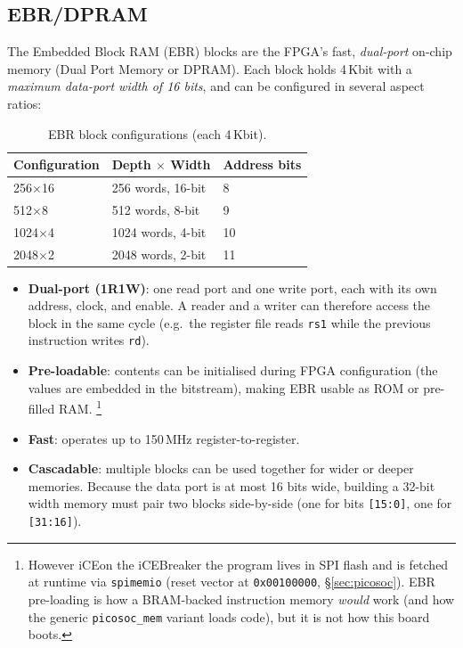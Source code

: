 \documentclass[9pt, a4paper]{extarticle}
\begin{document}
\subsection{EBR/DPRAM}

The Embedded Block RAM (EBR) blocks are the FPGA's fast, \textit{dual-port} on-chip memory (Dual Port Memory or DPRAM). Each block holds 4\,Kbit with a \textit{maximum data-port width of 16 bits}, and can be configured in several aspect ratios:

\begin{table}[htbp]
\centering\small
\begin{tabular}{@{}l l l@{}}
    \toprule
    Configuration & Depth $\times$ Width & Address bits \\
    \midrule
    256$\times$16 & 256 words, 16-bit & 8 \\
    512$\times$8  & 512 words, 8-bit  & 9 \\
    1024$\times$4 & 1024 words, 4-bit & 10 \\
    2048$\times$2 & 2048 words, 2-bit & 11 \\
    \bottomrule
\end{tabular}
\caption{EBR block configurations (each 4\,Kbit).}
\label{tab:ebr-config}
\end{table}

\begin{itemize}
    \item \textbf{Dual-port (1R1W)}: one read port and one write port, each with its own address, clock, and enable. A reader and a writer can therefore access the block in the same cycle (e.g.\ the register file reads \texttt{rs1} while the previous instruction writes \texttt{rd}).
    \item \textbf{Pre-loadable}: contents can be initialised during FPGA configuration (the values are embedded in the bitstream), making EBR usable as ROM or pre-filled RAM. \footnote{However iCEon the iCEBreaker the program lives in SPI flash and is fetched at runtime via \texttt{spimemio} (reset vector at \texttt{0x00100000}, \S\ref{sec:picosoc}). EBR pre-loading is how a BRAM-backed instruction memory \emph{would} work (and how the generic \texttt{picosoc\_mem} variant loads code), but it is not how this board boots.}
    \item \textbf{Fast}: operates up to 150\,MHz register-to-register.
    \item \textbf{Cascadable}: multiple blocks can be used together for wider or deeper memories. Because the data port is at most 16 bits wide, building a 32-bit width memory must pair two blocks side-by-side (one for bits \texttt{[15:0]}, one for \texttt{[31:16]}).
\end{itemize}
\end{document}
